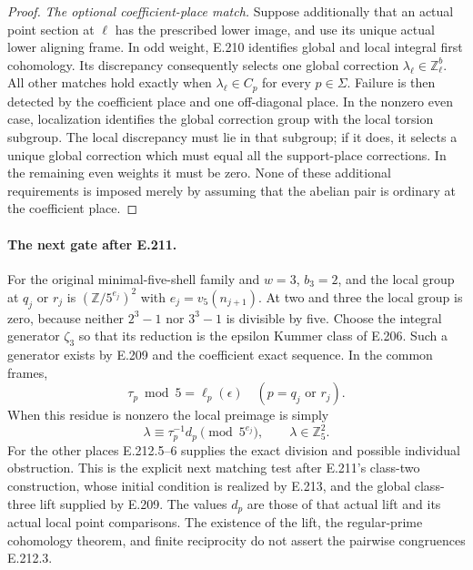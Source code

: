 \begin{proof}
\emph{The optional coefficient-place match.}
Suppose additionally that an actual point section at
$\ell$ has the prescribed lower image, and use its
unique actual lower aligning frame. In odd weight,
E.210 identifies global and local integral first
cohomology. Its discrepancy consequently selects one
global correction $\lambda_\ell\in\mathbb Z_\ell^b$.
All other matches hold exactly when
$\lambda_\ell\in C_p$ for every $p\in\Sigma$.
Failure is then detected by the coefficient place and
one off-diagonal place. In the nonzero even case,
localization identifies the global correction group
with the local torsion subgroup. The local discrepancy
must lie in that subgroup; if it does, it selects a
unique global correction which must equal all the
support-place corrections. In the remaining even
weights it must be zero. None of these additional
requirements is imposed merely by assuming that the
abelian pair is ordinary at the coefficient place.
\end{proof}

\paragraph{The next gate after E.211.}
For the original minimal-five-shell family and $w=3$,
$b_3=2$, and the local group at $q_j$ or $r_j$ is
$(\mathbb Z/5^{e_j})^2$ with
$e_j=v_5(n_{j+1})$. At two and three the local group
is zero, because neither $2^3-1$ nor $3^3-1$ is
divisible by five. Choose the integral generator
$\zeta_3$ so that its reduction is the epsilon
Kummer class of E.206. Such a generator exists by
E.209 and the coefficient exact sequence.
In the common frames,
\[
                \tau_p\bmod5=\ell_p(\epsilon)
       \quad(p=q_j\text{ or }r_j).
 \tag{E.212.7}
\]
When this residue is nonzero the local preimage is
simply
\[
       \lambda\equiv\tau_p^{-1}d_p\pmod{5^{e_j}},
              \qquad\lambda\in\mathbb Z_5^2.
 \tag{E.212.8}
\]
For the other places E.212.5--6 supplies the exact
division and possible individual obstruction. This
is the explicit next matching test after E.211's
class-two construction, whose initial condition is
realized by E.213, and the global class-three lift
supplied by E.209. The
values $d_p$ are those of that actual lift and
its actual local point comparisons. The existence
of the lift, the regular-prime cohomology theorem,
and finite reciprocity do not assert the pairwise
congruences E.212.3.
